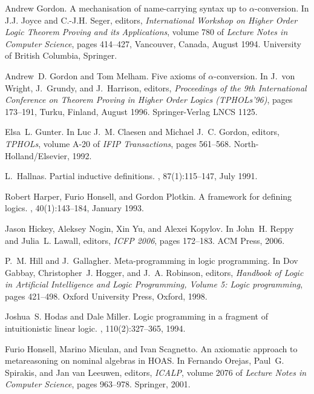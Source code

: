 \documentclass[final]{svjour3}
\begin{document}
\begin{thebibliography}{100}
Andrew Gordon.
\newblock A mechanisation of name-carrying syntax up to $\alpha$-conversion.
\newblock In {J.J. Joyce} and {C.-J.H. Seger}, editors, {\em International
  Workshop on Higher Order Logic Theorem Proving and its Applications}, volume
  780 of {\em Lecture Notes in Computer Science}, pages 414--427, Vancouver,
  Canada, August 1994. University of British Columbia, Springer.

Andrew~D. Gordon and Tom Melham.
\newblock Five axioms of $\alpha$-conversion.
\newblock In J.~von Wright, J.~Grundy, and J.~Harrison, editors, {\em
  Proceedings of the 9th International Conference on Theorem Proving in Higher
  Order Logics (TPHOLs'96)}, pages 173--191, Turku, Finland, August 1996.
  Springer-Verlag LNCS 1125.

Elsa~L. Gunter.
\newblock In Luc J.~M. Claesen and Michael J.~C. Gordon, editors, {\em TPHOLs},
  volume A-20 of {\em IFIP Transactions}, pages 561--568.
  North-Holland/Elsevier, 1992.

L.~Hallnas.
\newblock Partial inductive definitions.
, 87(1):115--147, July 1991.

Robert Harper, Furio Honsell, and Gordon Plotkin.
\newblock A framework for defining logics.
,
  40(1):143--184, January 1993.

Jason Hickey, Aleksey Nogin, Xin Yu, and Alexei Kopylov.
\newblock In John~H. Reppy and Julia~L. Lawall, editors, {\em ICFP 2006}, pages
  172--183. ACM Press, 2006.

P.~M. Hill and J.~Gallagher.
\newblock Meta-programming in logic programming.
\newblock In Dov Gabbay, Christopher~J. Hogger, and J.~A. Robinson, editors,
  {\em Handbook of Logic in Artificial Intelligence and Logic Programming,
  Volume 5: Logic programming}, pages 421--498. Oxford University Press,
  Oxford, 1998.

Joshua~S. Hodas and Dale Miller.
\newblock Logic programming in a fragment of intuitionistic linear logic.
, 110(2):327--365, 1994.

Furio Honsell, Marino Miculan, and Ivan Scagnetto.
\newblock An axiomatic approach to metareasoning on nominal algebras in {HOAS}.
\newblock In Fernando Orejas, Paul~G. Spirakis, and Jan van Leeuwen, editors,
  {\em ICALP}, volume 2076 of {\em Lecture Notes in Computer Science}, pages
  963--978. Springer, 2001.


\end{thebibliography}
\end{document}
